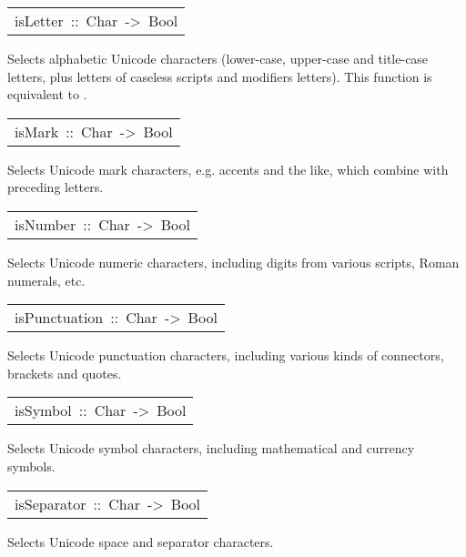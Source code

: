 \begin{haddockdesc}
\item[\begin{tabular}{@{}l}
isLetter\ ::\ Char\ ->\ Bool
\end{tabular}]\haddockbegindoc
Selects alphabetic Unicode characters (lower-case, upper-case and
 title-case letters, plus letters of caseless scripts and modifiers letters).
 This function is equivalent to .
\par

\end{haddockdesc}
\begin{haddockdesc}
\item[\begin{tabular}{@{}l}
isMark\ ::\ Char\ ->\ Bool
\end{tabular}]\haddockbegindoc
Selects Unicode mark characters, e.g. accents and the like, which
 combine with preceding letters.
\par

\end{haddockdesc}
\begin{haddockdesc}
\item[\begin{tabular}{@{}l}
isNumber\ ::\ Char\ ->\ Bool
\end{tabular}]\haddockbegindoc
Selects Unicode numeric characters, including digits from various
 scripts, Roman numerals, etc.
\par

\end{haddockdesc}
\begin{haddockdesc}
\item[\begin{tabular}{@{}l}
isPunctuation\ ::\ Char\ ->\ Bool
\end{tabular}]\haddockbegindoc
Selects Unicode punctuation characters, including various kinds
 of connectors, brackets and quotes.
\par

\end{haddockdesc}
\begin{haddockdesc}
\item[\begin{tabular}{@{}l}
isSymbol\ ::\ Char\ ->\ Bool
\end{tabular}]\haddockbegindoc
Selects Unicode symbol characters, including mathematical and
 currency symbols.
\par

\end{haddockdesc}
\begin{haddockdesc}
\item[\begin{tabular}{@{}l}
isSeparator\ ::\ Char\ ->\ Bool
\end{tabular}]\haddockbegindoc
Selects Unicode space and separator characters.
\par

\end{haddockdesc}

